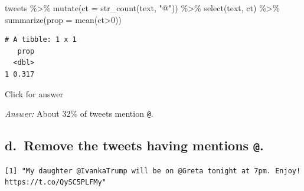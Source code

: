 \documentclass[
]{book}
\newenvironment{Shaded}{\begin{snugshade}}{\end{snugshade}}
\newcommand{\AttributeTok}[1]{\textcolor[rgb]{0.77,0.63,0.00}{#1}}
\newcommand{\DecValTok}[1]{\textcolor[rgb]{0.00,0.00,0.81}{#1}}
\newcommand{\FunctionTok}[1]{\textcolor[rgb]{0.00,0.00,0.00}{#1}}
\newcommand{\NormalTok}[1]{#1}
\newcommand{\OtherTok}[1]{\textcolor[rgb]{0.56,0.35,0.01}{#1}}
\newcommand{\SpecialCharTok}[1]{\textcolor[rgb]{0.00,0.00,0.00}{#1}}
\newcommand{\StringTok}[1]{\textcolor[rgb]{0.31,0.60,0.02}{#1}}
\begin{document}
\begin{Shaded}
\begin{Highlighting}[]
\NormalTok{tweets }\SpecialCharTok{\%\textgreater{}\%} \FunctionTok{mutate}\NormalTok{(}\AttributeTok{ct =} \FunctionTok{str\_count}\NormalTok{(text, }\StringTok{"@"}\NormalTok{)) }\SpecialCharTok{\%\textgreater{}\%}
  \FunctionTok{select}\NormalTok{(text, ct) }\SpecialCharTok{\%\textgreater{}\%}
  \FunctionTok{summarize}\NormalTok{(}\AttributeTok{prop =} \FunctionTok{mean}\NormalTok{(ct}\SpecialCharTok{\textgreater{}}\DecValTok{0}\NormalTok{))}
\end{Highlighting}
\end{Shaded}

\begin{verbatim}
# A tibble: 1 x 1
   prop
  <dbl>
1 0.317
\end{verbatim}

Click for answer

\emph{Answer:} About 32\% of tweets mention \texttt{@}.

\hypertarget{d.-remove-the-tweets-having-mentions-.}{%
\subsection{\texorpdfstring{d.~Remove the tweets having mentions \texttt{@}.}{d.~Remove the tweets having mentions @.}}\label{d.-remove-the-tweets-having-mentions-.}}

\begin{Shaded}
\end{Shaded}

\begin{verbatim}
[1] "My daughter @IvankaTrump will be on @Greta tonight at 7pm. Enjoy! https://t.co/QySC5PLFMy"
\end{verbatim}

\begin{Shaded}
\end{Shaded}
\end{document}
